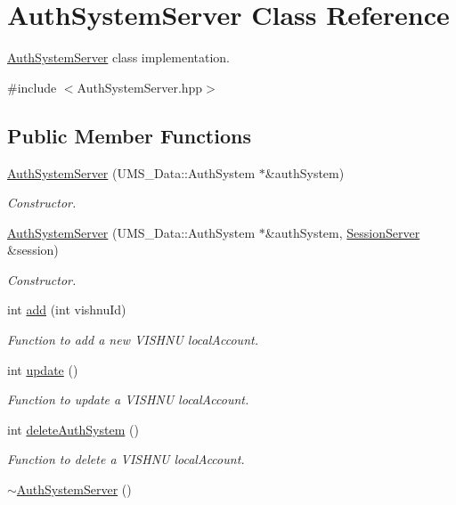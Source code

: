\hypertarget{classAuthSystemServer}{
\section{AuthSystemServer Class Reference}
\label{classAuthSystemServer}
}


\hyperlink{classAuthSystemServer}{AuthSystemServer} class implementation.  




{\ttfamily \#include $<$AuthSystemServer.hpp$>$}

\subsection*{Public Member Functions}
\begin{DoxyCompactItemize}
\item 
\hyperlink{classAuthSystemServer_a2e077f7f4b3ea33c6434bd125bf3f2dd}{AuthSystemServer} (UMS\_\-Data::AuthSystem $\ast$\&authSystem)
\begin{DoxyCompactList}\small\item\em Constructor. \item\end{DoxyCompactList}\item 
\hyperlink{classAuthSystemServer_ab41f9c6dbde079b28e9c0063bddaf004}{AuthSystemServer} (UMS\_\-Data::AuthSystem $\ast$\&authSystem, \hyperlink{classSessionServer}{SessionServer} \&session)
\begin{DoxyCompactList}\small\item\em Constructor. \item\end{DoxyCompactList}\item 
int \hyperlink{classAuthSystemServer_a1b56a550d2f0846da17ec8469f07a359}{add} (int vishnuId)
\begin{DoxyCompactList}\small\item\em Function to add a new VISHNU localAccount. \item\end{DoxyCompactList}\item 
int \hyperlink{classAuthSystemServer_a6f5a2e1c9b6bc32f1d16427a67b6fa95}{update} ()
\begin{DoxyCompactList}\small\item\em Function to update a VISHNU localAccount. \item\end{DoxyCompactList}\item 
int \hyperlink{classAuthSystemServer_aba3c8a49fb057f0e8d66b48b4dca9c46}{deleteAuthSystem} ()
\begin{DoxyCompactList}\small\item\em Function to delete a VISHNU localAccount. \item\end{DoxyCompactList}\item 
\hypertarget{classAuthSystemServer_a6b4ca9ead99fcccea2fa09235dabc887}{
\hyperlink{classAuthSystemServer_a6b4ca9ead99fcccea2fa09235dabc887}{$\sim$AuthSystemServer} ()}
\label{classAuthSystemServer_a6b4ca9ead99fcccea2fa09235dabc887}


\end{DoxyCompactItemize}
